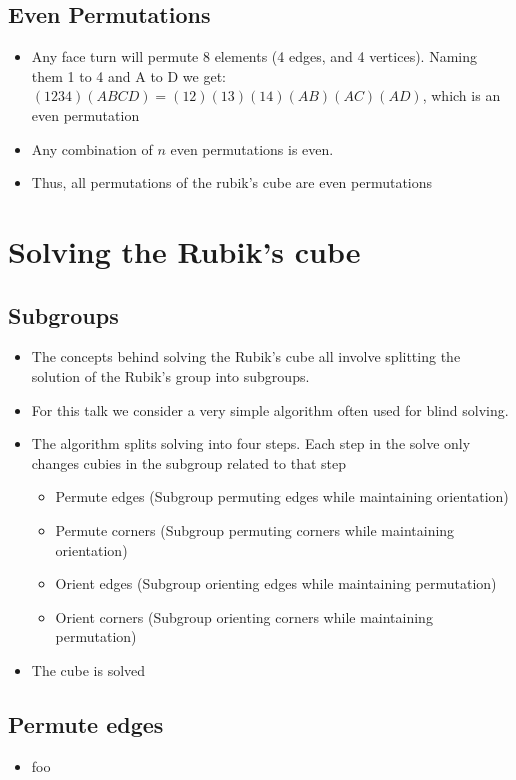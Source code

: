 \documentclass[xcolor=pdftex,dvipsnames,table]{beamer}
\begin{document}
\subsection{Even Permutations}
\begin{frame}
  \begin{itemize}
    \item Any face turn will permute 8 elements (4 edges, and 4 vertices). Naming them 1 to 4 and A to D we get: $(1234)(ABCD) = (12)(13)(14)(AB)(AC)(AD)$, which is an even permutation
    \item Any combination of $n$ even permutations is even.
    \item Thus, all permutations of the rubik's cube are even permutations
  \end{itemize}
\end{frame}

\section{Solving the Rubik's cube}

\subsection{Subgroups}
\begin{frame}
  \begin{itemize}
    \item The concepts behind solving the Rubik's cube all involve splitting the solution of the Rubik's group into subgroups.
    \item For this talk we consider a very simple algorithm often used for blind solving.
    \item The algorithm splits solving into four steps. Each step in the solve only changes cubies in the subgroup related to that step
      \begin{itemize}
      \item Permute edges (Subgroup permuting edges while maintaining orientation)
      \item Permute corners (Subgroup permuting corners while maintaining orientation)
      \item Orient edges (Subgroup orienting edges while maintaining permutation)
      \item Orient corners (Subgroup orienting corners while maintaining permutation)
      \end{itemize}
    \item The cube is solved
  \end{itemize}
\end{frame}

\subsection{Permute edges}
\begin{frame}
  \begin{itemize}
  \item foo
  \end{itemize}
\end{frame}
\end{document}
